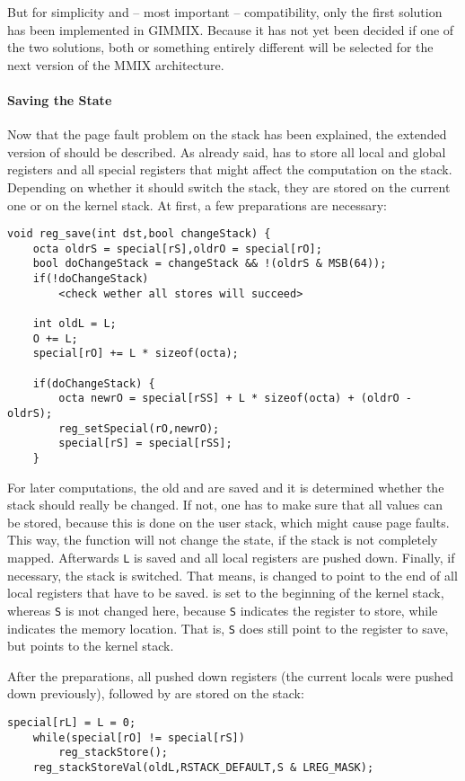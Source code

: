 But for simplicity and -- most important -- compatibility, only the first solution has been implemented in GIMMIX. Because it has not yet been decided if one of the two solutions, both or something entirely different will be selected for the next version of the MMIX architecture.

\paragraph{Saving the State}

Now that the page fault problem on the stack has been explained, the extended version of  should be described. As already said,  has to store all local and global registers and all special registers that might affect the computation on the stack. Depending on whether it should switch the stack, they are stored on the current one or on the kernel stack. At first, a few preparations are necessary:
\begin{lstlisting}[language=GIMMIXC,caption={Implementation of {\tt reg\_save}, part 1 (partially pseudo-code)}]
void reg_save(int dst,bool changeStack) {
	octa oldrS = special[rS],oldrO = special[rO];
	bool doChangeStack = changeStack && !(oldrS & MSB(64));
	if(!doChangeStack)
		<check wether all stores will succeed>
	
	int oldL = L;
	O += L;
	special[rO] += L * sizeof(octa);
	
	if(doChangeStack) {
		octa newrO = special[rSS] + L * sizeof(octa) + (oldrO - oldrS);
		reg_setSpecial(rO,newrO);
		special[rS] = special[rSS];
	}
\end{lstlisting}
For later computations, the old  and  are saved and it is determined whether the stack should really be changed. If not, one has to make sure that all values can be stored, because this is done on the user stack, which might cause page faults. This way, the function will not change the state, if the stack is not completely mapped. Afterwards {\tt L} is saved and all local registers are pushed down. Finally, if necessary, the stack is switched. That means,  is changed to point to the end of all local registers that have to be saved.  is set to the beginning of the kernel stack, whereas {\tt S} is \i{not} changed here, because {\tt S} indicates the register to store, while  indicates the memory location. That is, {\tt S} does still point to the register to save, but  points to the kernel stack.

After the preparations, all pushed down registers (the current locals were pushed down previously), followed by  are stored on the stack:
\begin{lstlisting}[language=GIMMIXC,caption={Implementation of {\tt reg\_save}, part 2}]
	special[rL] = L = 0;
	while(special[rO] != special[rS])
		reg_stackStore();
	reg_stackStoreVal(oldL,RSTACK_DEFAULT,S & LREG_MASK);
\end{lstlisting}

